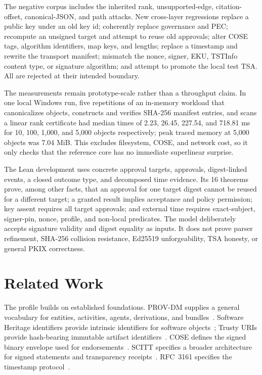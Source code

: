 \documentclass[11pt]{article}
\begin{document}
The negative corpus includes the inherited rank, unsupported-edge,
citation-offset, canonical-JSON, and path attacks. New cross-layer regressions
replace a public key under an old key id; coherently replace governance and PEC;
recompute an unsigned target and attempt to reuse old approvals; alter COSE tags,
algorithm identifiers, map keys, and lengths; replace a timestamp and rewrite
the transport manifest; mismatch the nonce, signer, EKU, TSTInfo content type,
or signature algorithm; and attempt to promote the local test TSA. All are
rejected at their intended boundary.

The measurements remain prototype-scale rather than a throughput claim. In one
local Windows run, five repetitions of an in-memory workload that canonicalizes
objects, constructs and verifies SHA-256 manifest entries, and scans a linear
rank certificate had median times of 2.23, 26.45, 227.54, and 718.81 ms for
10, 100, 1,000, and 5,000 objects respectively; peak traced memory at 5,000
objects was 7.04 MiB. This excludes filesystem, COSE, and network cost, so it
only checks that the reference core has no immediate superlinear surprise.

The Lean development uses concrete approval targets, approvals, digest-linked
events, a closed outcome type, and decomposed time evidence. Its 16 theorems
prove, among other facts, that an approval for one target digest cannot be
reused for a different target; a granted result implies acceptance and policy
permission; key assent requires all target approvals; and external time
requires exact-subject, signer-pin, nonce, profile, and non-local predicates.
The model deliberately accepts signature validity and digest equality as inputs.
It does not prove parser refinement, SHA-256 collision resistance, Ed25519
unforgeability, TSA honesty, or general PKIX correctness.

\section{Related Work}

The profile builds on established foundations. PROV-DM supplies a general vocabulary for entities, activities, agents, derivations, and bundles~\cite{prov}. Software Heritage identifiers provide intrinsic identifiers for software objects~\cite{swhid}; Trusty URIs provide hash-bearing immutable artifact identifiers~\cite{trusty}. COSE defines the signed binary envelope used for endorsements~\cite{cose}. SCITT specifies a broader architecture for signed statements and transparency receipts~\cite{scitt}. RFC~3161 specifies the timestamp protocol~\cite{rfc3161}.
\end{document}
